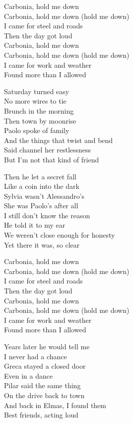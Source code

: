 \begin{lyrics}
Carbonia, hold me down\\
Carbonia, hold me down (hold me down)\\
I came for steel and roads\\
Then the day got loud\\
Carbonia, hold me down\\
Carbonia, hold me down (hold me down)\\
I came for work and weather\\
Found more than I allowed

Saturday turned easy\\
No more wires to tie\\
Brunch in the morning\\
Then town by moonrise\\
Paolo spoke of family\\
And the things that twist and bend\\
Said channel her restlessness\\
But I’m not that kind of friend

Then he let a secret fall\\
Like a coin into the dark\\
Sylvia wasn’t Alessandro’s\\
She was Paolo’s after all\\
I still don’t know the reason\\
He told it to my ear\\
We weren’t close enough for honesty\\
Yet there it was, so clear

Carbonia, hold me down\\
Carbonia, hold me down (hold me down)\\
I came for steel and roads\\
Then the day got loud\\
Carbonia, hold me down\\
Carbonia, hold me down (hold me down)\\
I came for work and weather\\
Found more than I allowed

Years later he would tell me\\
I never had a chance\\
Greca stayed a closed door\\
Even in a dance\\
Pilar said the same thing\\
On the drive back to town\\
And back in Elmas, I found them\\
Best friends, acting loud
\end{lyrics}

